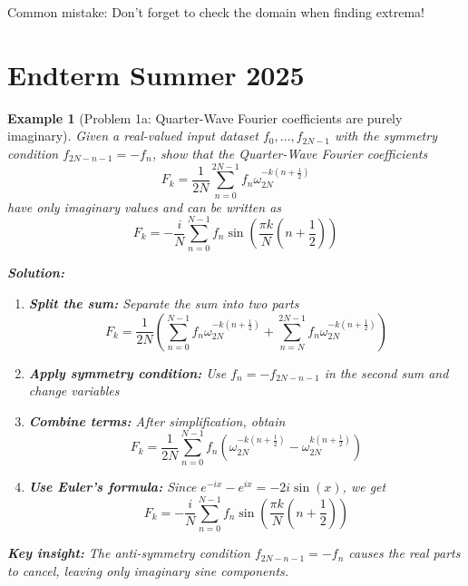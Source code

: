 \documentclass[11pt,a4paper]{article}
\newtheorem{example}[theorem]{Example}
\begin{document}
\begin{warning}
    Common mistake: Don't forget to check the domain when finding extrema!
\end{warning}

\section{Endterm Summer 2025}

\begin{example}[Problem 1a: Quarter-Wave Fourier coefficients are purely imaginary]
Given a real-valued input dataset $f_0, \ldots, f_{2N-1}$ with the symmetry condition $f_{2N-n-1} = -f_n$, show that the Quarter-Wave Fourier coefficients
$$F_k = \frac{1}{2N} \sum_{n=0}^{2N-1} f_n \omega_{2N}^{-k(n+\frac{1}{2})}$$
have only imaginary values and can be written as
$$F_k = -\frac{i}{N} \sum_{n=0}^{N-1} f_n \sin\left(\frac{\pi k}{N}\left(n + \frac{1}{2}\right)\right)$$

\textbf{Solution:}

\begin{enumerate}
\item \textbf{Split the sum:} Separate the sum into two parts
$$F_k = \frac{1}{2N}\left(\sum_{n=0}^{N-1} f_n \omega_{2N}^{-k(n+\frac{1}{2})} + \sum_{n=N}^{2N-1} f_n \omega_{2N}^{-k(n+\frac{1}{2})}\right)$$

\item \textbf{Apply symmetry condition:} Use $f_n = -f_{2N-n-1}$ in the second sum and change variables

\item \textbf{Combine terms:} After simplification, obtain
$$F_k = \frac{1}{2N} \sum_{n=0}^{N-1} f_n \left(\omega_{2N}^{-k(n+\frac{1}{2})} - \omega_{2N}^{k(n+\frac{1}{2})}\right)$$

\item \textbf{Use Euler's formula:} Since $e^{-ix} - e^{ix} = -2i\sin(x)$, we get
$$F_k = -\frac{i}{N} \sum_{n=0}^{N-1} f_n \sin\left(\frac{\pi k}{N}\left(n + \frac{1}{2}\right)\right)$$
\end{enumerate}

\textbf{Key insight:} The anti-symmetry condition $f_{2N-n-1} = -f_n$ causes the real parts to cancel, leaving only imaginary sine components.
\end{example}
\end{document}

